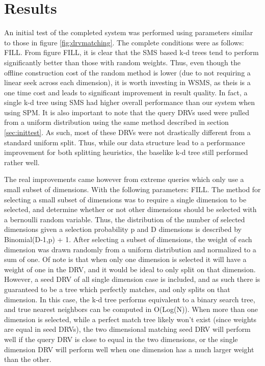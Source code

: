 \chapter{Results} %

\label{results} %


An initial test of the completed system was performed using parameters similar to those in figure \ref{fig:drvmatching}.  The complete conditions were as follows: FILL.  From figure FILL, it is clear that the SMS based k-d trees tend to perform significantly better than those with random weights.  Thus, even though the offline construction cost of the random method is lower (due to not requiring a linear seek across each dimension), it is worth investing in WSMS, as theis is a one time cost and leads to significant improvement in result quality.  In fact, a single k-d tree using SMS had higher overall performance than our system when using SPM.  It is also important to note that the query DRVs used were pulled from a uniform distribution using the same method described in section \ref{sec:inittest}.  As such, most of these DRVs were not drastically different from a standard uniform split.  Thus, while our data structure lead to a performance improvement for both splitting heuristics, the baselike k-d tree still performed rather well.

The real improvements came however from extreme queries which only use a small subset of dimensions.  With the following parameters: FILL.  The method for selecting a small subset of dimensions was to require a single dimension to be selected, and determine whether or not other dimensions should be selected with a bernoulli random variable.  Thus, the distribution of the number of selected dimensions given a selection probability p and D dimensions is described by Binomial(D-1,p) + 1.  After selecting a subset of dimensions, the weight of each dimension was drawn randomly from a uniform distribution and normalized to a sum of one.  Of note is that when only one dimension is selected it will have a weight of one in the DRV, and it would be ideal to only split on that dimension.  However, a seed DRV of all single dimension case is included, and as such there is guaranteed to be a tree which perfectly matches, and only splits on that dimension.  In this case, the k-d tree performs equivalent to a binary search tree, and true nearest neighbors can be computed in O(Log(N)).  When more than one dimension is selected, while a perfect match tree likely won't exist (since weights are equal in seed DRVs), the two dimensional matching seed DRV will perform well if the query DRV is close to equal in the two dimensions, or the single dimension DRV will perform well when one dimension has a much larger weight than the other.

